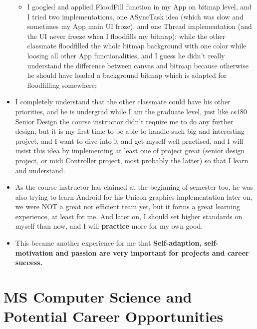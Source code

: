 \documentclass[9pt,b5paper]{article}
\begin{document}
\begin{itemize}
\begin{itemize}
\item I googled and applied FloodFill function in my App on bitmap level, and I tried two implementations, one ASyncTask idea (which was slow and sometimes my App main UI froze), and one Thread implementation (and the UI never freeze when I floodfills my bitmap); while the other classmate floodfilled the whole bitmap background with one color while loosing all other App functionalities, and I guess he didn't really understand the difference between canvas and bitmap because otherwise he should have loaded a background bitmap which is adapted for floodfilling somewhere;
\end{itemize}
\item I completely understand that the other classmate could have his other priorities, and he is undergrad while I am the graduate level, just like cs480 Senior Design the course instructor didn't require me to do any further design, but it is my first time to be able to handle such big and interesting project, and I want to dive into it and get myself well-practised, and I will insist this idea by implementing at least one of project great (senior design project, or midi Controller project, most probably the latter) so that I learn and understand.
\item As the course instructor has claimed at the beginning of semester too, he was also trying to learn Android for his Unicon graphics implementation later on, we were NOT a great nor efficient team yet, but it forms a great learning experience, at least for me. And later on, I should set higher standards on myself than now, and I will \textbf{practice} more for my own good.
\item This became another experience for me that \textbf{Self-adaption, self-motivation and passion are very important for projects and career success.}
\end{itemize}

\section{MS Computer Science and Potential Career Opportunities}
\label{sec-9}
\end{document}
